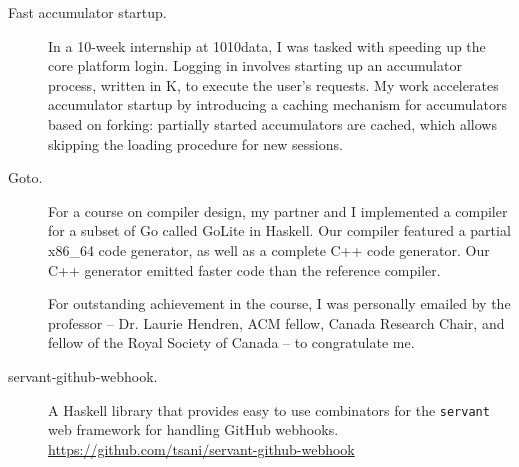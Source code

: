 \documentclass{article}
\begin{document}
\begin{description}
  \item[Fast accumulator startup.]
    In a 10-week internship at 1010data, I was tasked with speeding up the
    core platform login. Logging in involves starting up an accumulator
    process, written in K, to execute the user's requests. My work
    accelerates accumulator startup by introducing a caching mechanism for
    accumulators based on forking: partially started accumulators are
    cached, which allows skipping the loading procedure for new sessions.

  \item[Goto.]
     For a course on compiler design, my partner and I implemented a compiler
     for a subset of Go called GoLite in Haskell. Our compiler featured a
     partial x86\_64 code generator, as well as a complete C++ code generator.
     Our C++ generator emitted faster code than the reference compiler.

     For outstanding achievement in the course, I was personally emailed by the
     professor -- Dr. Laurie Hendren, ACM fellow, Canada Research Chair, and
     fellow of the Royal Society of Canada -- to congratulate me.

  \item[servant-github-webhook.] A Haskell library that provides easy to
    use combinators for the \texttt{servant} web framework for handling
    GitHub webhooks.
    \url{https://github.com/tsani/servant-github-webhook}
\end{description}
\end{document}
